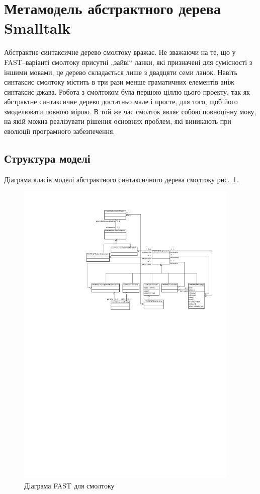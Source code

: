 \documentclass[12pt,a4paper]{article}
\begin{document}
\clearpage

\section{Метамодель абстрактного дерева Smalltalk}

Абстрактне синтаксичне дерево смолтоку вражає. Не зважаючи на те, що у FAST--варіанті смолтоку присутні „зайві“ ланки, які призначені для сумісності з іншими мовами, це дерево складається лише з двадцяти семи ланок. Навіть синтаксис смолтоку містить в три рази менше граматичних елементів аніж синтаксис джава\cite{meet-grammars}. Робота з смолтоком була першою ціллю цього проекту, так як абстрактне синтаксичне дерево достатньо мале і просте, для того, щоб його змоделювати повною мірою. В той же час смолток являє собою повноцінну мову, на якій можна реалізувати рішення основних проблем, які виникають при еволюції програмного забезпечення.

\subsection{Структура моделі}

Діаграма класів моделі абстрактного синтаксичного дерева смолтоку рис.~\ref{smtFast}.

\begin{figure}[h]
  \centering
    \includegraphics[width=0.95\textwidth]{SmalltalkASTClassDiagram}
  \caption{Діаграма FAST для смолтоку\label{smtFast}}
\end{figure}
\end{document}

